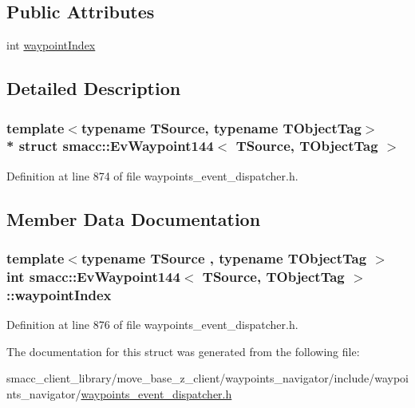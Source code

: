 \subsection*{Public Attributes}
\begin{DoxyCompactItemize}
\item 
int \hyperlink{structsmacc_1_1EvWaypoint144_a243183a73b478f48860e74e037483d65}{waypoint\+Index}
\end{DoxyCompactItemize}


\subsection{Detailed Description}
\subsubsection*{template$<$typename T\+Source, typename T\+Object\+Tag$>$\\*
struct smacc\+::\+Ev\+Waypoint144$<$ T\+Source, T\+Object\+Tag $>$}



Definition at line 874 of file waypoints\+\_\+event\+\_\+dispatcher.\+h.



\subsection{Member Data Documentation}
\subsubsection[{\texorpdfstring{waypoint\+Index}{waypointIndex}}]{\setlength{\rightskip}{0pt plus 5cm}template$<$typename T\+Source , typename T\+Object\+Tag $>$ int {\bf smacc\+::\+Ev\+Waypoint144}$<$ T\+Source, T\+Object\+Tag $>$\+::waypoint\+Index}\hypertarget{structsmacc_1_1EvWaypoint144_a243183a73b478f48860e74e037483d65}{}\label{structsmacc_1_1EvWaypoint144_a243183a73b478f48860e74e037483d65}


Definition at line 876 of file waypoints\+\_\+event\+\_\+dispatcher.\+h.



The documentation for this struct was generated from the following file\+:\begin{DoxyCompactItemize}
\item 
smacc\+\_\+client\+\_\+library/move\+\_\+base\+\_\+z\+\_\+client/waypoints\+\_\+navigator/include/waypoints\+\_\+navigator/\hyperlink{waypoints__event__dispatcher_8h}{waypoints\+\_\+event\+\_\+dispatcher.\+h}\end{DoxyCompactItemize}
